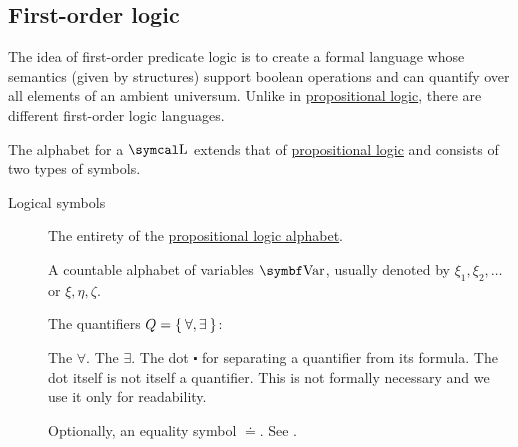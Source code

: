 \subsection{First-order logic}\label{subsec:first_order_logic}

\begin{definition}\label{def:first_order_logic_alphabet}
  The idea of first-order predicate logic is to create a formal language whose semantics (given by structures) support boolean operations and can quantify over all elements of an ambient universum. Unlike in \hyperref[subsec:propositional_logic]{propositional logic}, there are different first-order logic languages.

  The alphabet for a  \( \CL \) extends that of \hyperref[subsec:propositional_logic]{propositional logic} and consists of two types of symbols.

  \begin{description}
    \item[Logical symbols]\mbox{}
    \begin{DefEnum}[series=def:first_order_logic_alphabet]
       The entirety of the \hyperref[subsec:propositional_logic]{propositional logic alphabet}.

       A countable alphabet of variables \( \Bold{Var} \), usually denoted by \( \xi_1, \xi_2, \ldots \) or \( \xi, \eta, \zeta \).

       The quantifiers \( Q = \Set{ \forall, \exists } \):
      \begin{DefEnum}
         The  \( \forall \).
         The  \( \exists \).
         The dot \( \centerdot \) for separating a quantifier from its formula. The dot itself is not itself a quantifier. This is not formally necessary and we use it only for readability.
      \end{DefEnum}

       Optionally, an equality symbol \( \doteq \). See .
    \end{DefEnum}


\end{description}
\end{definition}
